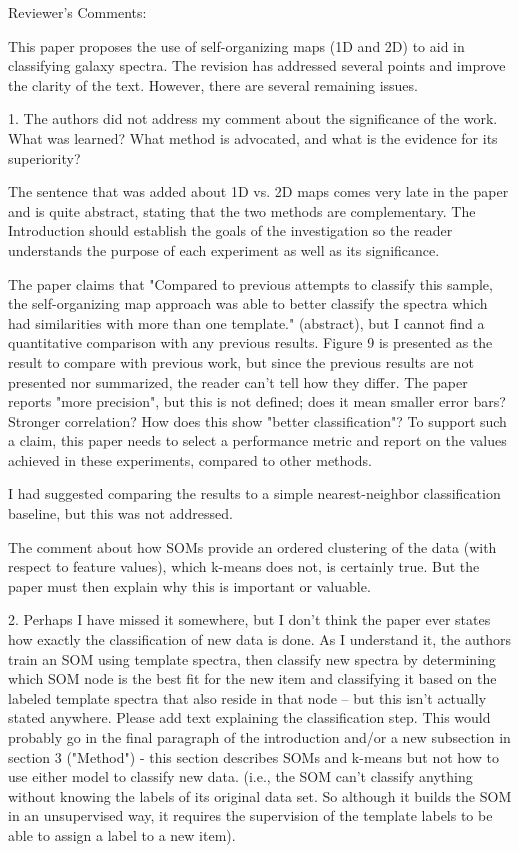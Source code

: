 Reviewer's Comments:

This paper proposes the use of self-organizing maps (1D and 2D) to aid in classifying galaxy spectra.  The revision has addressed several points and improve the clarity of the text.  However, there are several remaining issues.

1. The authors did not address my comment about the significance of the work.  What was learned?  What method is advocated, and what is the evidence for its superiority?

The sentence that was added about 1D vs. 2D maps comes very late in the paper and is quite abstract, stating that the two methods are complementary.  The Introduction should establish the goals of the investigation so the reader understands the purpose of each experiment as well as its significance.

The paper claims that "Compared to previous attempts to classify this sample, the self-organizing map approach was able to better classify the spectra which had similarities with more than one template." (abstract), but I cannot find a quantitative comparison with any previous results.  Figure 9 is presented as the result to compare with previous work, but since the previous results are not presented nor summarized, the reader can't tell how they differ.  The paper reports "more precision", but this is not defined; does it mean smaller error bars?  Stronger correlation?  How does this show "better classification"?  To support such a claim, this paper needs to select a performance metric and report on the values achieved in these experiments, compared to other methods.

I had suggested comparing the results to a simple nearest-neighbor classification baseline, but this was not addressed.

The comment about how SOMs provide an ordered clustering of the data (with respect to feature values), which k-means does not, is certainly true.  But the paper must then explain why this is important or valuable.

2. Perhaps I have missed it somewhere, but I don't think the paper ever states how exactly the classification of new data is done.  As I understand it, the authors train an SOM using template spectra, then classify new spectra by determining which SOM node is the best fit for the new item and classifying it based on the labeled template spectra that also reside in that node -- but this isn't actually stated anywhere.  Please add text explaining the classification step.  This would probably go in the final paragraph of the introduction and/or a new subsection in section 3 ("Method") - this section describes SOMs and k-means but not how to use either model to classify new data. (i.e., the SOM can't classify anything without knowing the labels of its original data set.  So although it builds the SOM in an unsupervised way, it requires the supervision of the template labels to be able to assign a label to a new item).

